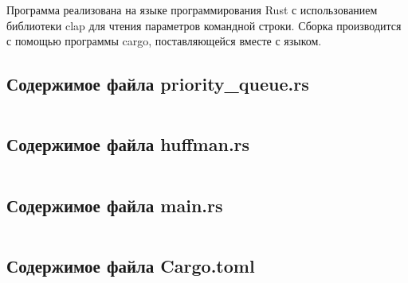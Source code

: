 \documentclass[a4paper,oneside]{article}
\theoremstyle{definition}
\begin{document}
Программа реализована на языке программирования Rust с использованием библиотеки
clap для чтения параметров командной строки. Сборка производится с помощью
программы cargo, поставляющейся вместе с языком.

\subsection{Содержимое файла priority\_queue.rs}
\inputminted{rust}{../../lab1-rs/src/priority_queue.rs}

\subsection{Содержимое файла huffman.rs}
\inputminted{rust}{../../lab1-rs/src/huffman.rs}

\subsection{Содержимое файла main.rs}
\inputminted{rust}{../../lab1-rs/src/main.rs}

\subsection{Содержимое файла Cargo.toml}
\inputminted{toml}{../../lab1-rs/Cargo.toml}
\end{document}
